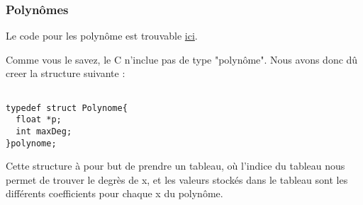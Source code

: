 \documentclass[letter]{article}
\begin{document}
\subsubsection{Polynômes}
\label{sec:orgdc6f25c}

Le code pour les polynôme est trouvable \href{polynome.c}{ici}. 

Comme vous le savez, le C n'inclue pas de type "polynôme". Nous avons donc dû creer la structure suivante :

\begin{verbatim}

typedef struct Polynome{
  float *p;
  int maxDeg;
}polynome;

\end{verbatim}

Cette structure à pour but de prendre un tableau, où l'indice du tableau nous permet de trouver le degrès de x, et les valeurs stockés dans le tableau sont les différents coefficients pour chaque x du polynôme.
\end{document}
